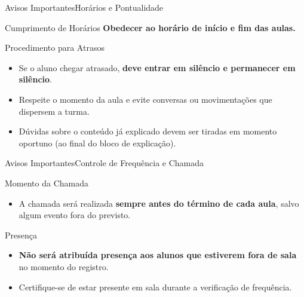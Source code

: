 \documentclass[9pt]{beamer}
\begin{document}
\begin{frame}{Avisos Importantes}{Horários e Pontualidade}
  \begin{alertblock}{Cumprimento de Horários}
    \textbf{Obedecer ao horário de início e fim das aulas.}
  \end{alertblock}

  \begin{block}{Procedimento para Atrasos}
    \begin{itemize}
      \item Se o aluno chegar atrasado, \textbf{deve entrar em silêncio e permanecer em silêncio}.
      \item Respeite o momento da aula e evite conversas ou movimentações que dispersem a turma.
      \item Dúvidas sobre o conteúdo já explicado devem ser tiradas em momento oportuno (ao final do bloco de explicação).
    \end{itemize}
  \end{block}
\end{frame}

\begin{frame}{Avisos Importantes}{Controle de Frequência e Chamada}
  \begin{block}{Momento da Chamada}
    \begin{itemize}
      \item A chamada será realizada \textbf{sempre antes do término de cada aula}, salvo algum evento fora do previsto.
    \end{itemize}
  \end{block}

  \begin{alertblock}{Presença}
    \begin{itemize}
      \item \textbf{Não será atribuída presença aos alunos que estiverem fora de sala} no momento do registro.
      \item Certifique-se de estar presente em sala durante a verificação de frequência.
    \end{itemize}
  \end{alertblock}
\end{frame}
\end{document}
